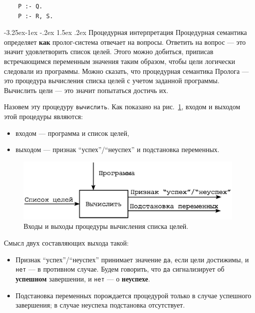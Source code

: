 \documentclass[12pt, openany, twoside]{book} %
\makeatletter
\renewcommand\subsection{\@startsection{subsection}{2}{\z@}%
                                     {-3.25ex\@plus -1ex \@minus -.2ex}%
                                     {1.5ex \@plus .2ex}%
                                     {\normalfont\normalsize\bfseries}}
\makeatother
\begin{document}
{\tt\begin{verbatim}
    Р :- Q.
    Р :- R, S.
\end{verbatim}}

\subsection{Процедурная интерпретация}
Процедурная семантика определяет \textbf{как} пролог-система отвечает на вопросы. Ответить на вопрос --- это значит удовлетворить список целей. Этого можно добиться, приписав встречающимся переменным значения таким образом, чтобы цели логически следовали из программы. Можно сказать, что процедурная семантика Пролога --- это процедура вычисления списка целей с учетом заданной программы. Вычислить цели --- это значит попытаться достичь их.

Назовем эту процедуру \texttt{вычислить}. Как показано на рис.~\ref{pic:proc}, входом и выходом этой процедуры являются:
\begin{itemize}
\item[] входом --- программа и список целей,
\item[] выходом --- признак ``успех''/``неуспех'' и подстановка переменных.
\end{itemize}

\begin{figure}[h]
\begin{center}
\includegraphics[scale=0.7]{pics/imp_proc.eps}
\end{center}
\caption{Входы и выходы процедуры вычисления списка целей.}
\label{pic:proc}
\end{figure}

\noindent Смысл двух составляющих выхода такой:
\begin{itemize}
\item[(1)] Признак ``успех''/``неуспех'' принимает значение {\tt да}, если цели достижимы, и {\tt нет} --- в противном случае. Будем говорить, что {\tt да} сигнализирует об {\bf успешном} завершении, и {\tt нет} --- о {\bf неуспехе}.

\item[(2)] Подстановка переменных порождается процедурой только в случае успешного завершения; в случае неуспеха подстановка отсутствует.
\end{itemize}
\end{document}
